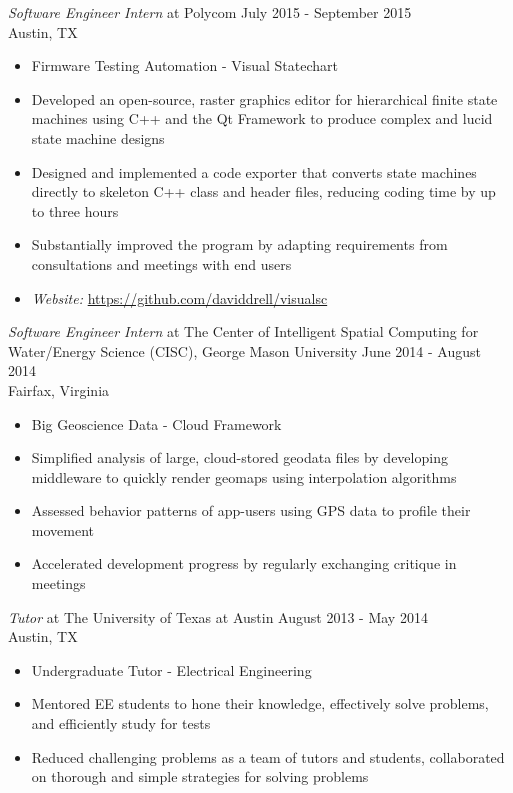 \documentclass[line,margin]{res}
\begin{document}
\begin{resume}
                {\sl Software Engineer Intern} at Polycom \hfill            July 2015 - September 2015\\        
                Austin, TX 
                \begin{itemize}  \itemsep -2pt %
                  \item         Firmware Testing Automation - Visual Statechart 
                 \item Developed an open-source, raster graphics editor for hierarchical finite state machines using C++ and the Qt Framework to produce complex and lucid state machine designs
                 \item Designed and implemented a code exporter that converts state machines directly to skeleton C++ class and header files, reducing coding time by up to three hours
                 \item Substantially improved the program by adapting requirements from consultations and meetings with end users
                 \item \textit{Website: }  \url{https://github.com/daviddrell/visualsc}
                 \end{itemize}

                 {\sl Software Engineer Intern} at The Center of Intelligent Spatial Computing for Water/Energy Science (CISC), George Mason University \hfill June 2014 - August 2014\\
                 Fairfax, Virginia
                 \begin{itemize}
                 \item Big Geoscience Data - Cloud Framework
                 \item Simplified analysis of large, cloud-stored geodata files by developing middleware to quickly render geomaps using interpolation algorithms
                 \item Assessed behavior patterns of app-users using GPS data to profile their movement
                 \item Accelerated development progress by regularly exchanging critique in meetings
                 \end{itemize}

                 {\sl Tutor} at The University of Texas at Austin \hfill August 2013 - May 2014\\
                 Austin, TX
                 \begin{itemize}
                 \item Undergraduate Tutor - Electrical Engineering
                 \item Mentored EE students to hone their knowledge, effectively solve problems, and efficiently study for tests
                 \item Reduced challenging problems as a team of tutors and students, collaborated on thorough and simple strategies for solving problems
                 \end{itemize}
 

\end{resume}
\end{document}
